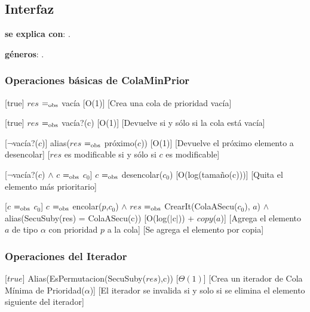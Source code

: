 \subsection{Interfaz}

	\textbf{se explica con}: .

	\textbf{géneros}: .

\subsubsection{Operaciones básicas de ColaMinPrior}

	[true]
	{$res$ $=_{\mathrm{obs}}$ vacía}
	[O(1)]
	[Crea una cola de prioridad vacía]

	[true]
	{$res$ $=_{\mathrm{obs}}$ vacía?(c)}
	[O(1)]
	[Devuelve  si y sólo si la cola está vacía]

	[$\neg$vacía?($c$)]
	{alias($res$ $=_{\mathrm{obs}}$ próximo($c$))}
	[O(1)]
	[Devuelve el próximo elemento a desencolar]
	[$res$ es modificable si y sólo si $c$ es modificable]

	[$\neg$vacía?($c$) $\land$ $c$ $=_{\mathrm{obs}}$ $c_0$]
	{$c$ $=_{\mathrm{obs}}$ desencolar($c_0$)}
	[O(log(tamaño(c)))]
	[Quita el elemento más prioritario]

	[$c$ $=_{\mathrm{obs}}$ $c_0$]
	{$c$ $=_{\mathrm{obs}}$ encolar($p$,$c_0$) $\wedge$ $res$ $=_{\mathrm{obs}}$ CrearIt(ColaASecu($c_0$), $a$) $\wedge$ alias(SecuSuby(res) = ColaASecu(c))}
	[O(log($\vert$c$\vert$)) + $copy$($a$)]
	[Agrega el elemento $a$ de tipo $\alpha$ con prioridad $p$ a la cola]
	[Se agrega el elemento por copia]


\subsubsection{Operaciones del Iterador}

	[$true$]
	{Alias(EsPermutacion(SecuSuby($res$),c))}
	[$\Theta(1)$]
	[Crea un iterador de Cola Mínima de Prioridad($\alpha$)]
	[El iterador se invalida si y solo si se elimina el elemento siguiente del iterador]

